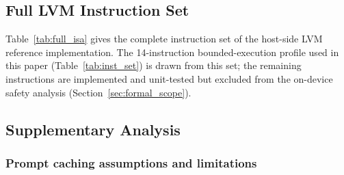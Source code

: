 \documentclass[a4paper,fleqn,longmktitle]{cas-dc}
\begin{document}
\subsection{Full LVM Instruction Set}
\label{app:full_isa}

Table~\ref{tab:full_isa} gives the complete instruction set of the host-side LVM reference implementation. The 14-instruction bounded-execution profile used in this paper (Table~\ref{tab:inst_set}) is drawn from this set; the remaining instructions are implemented and unit-tested but excluded from the on-device safety analysis (Section~\ref{sec:formal_scope}).

\begin{table}[t]
\centering
\caption{LVM instruction set in the host-side reference implementation, grouped by category.}
\label{tab:full_isa}
\footnotesize
{}
\end{table}

\subsection{Supplementary Analysis}
\label{app:f}

\subsubsection{Prompt caching assumptions and limitations}
\end{document}
